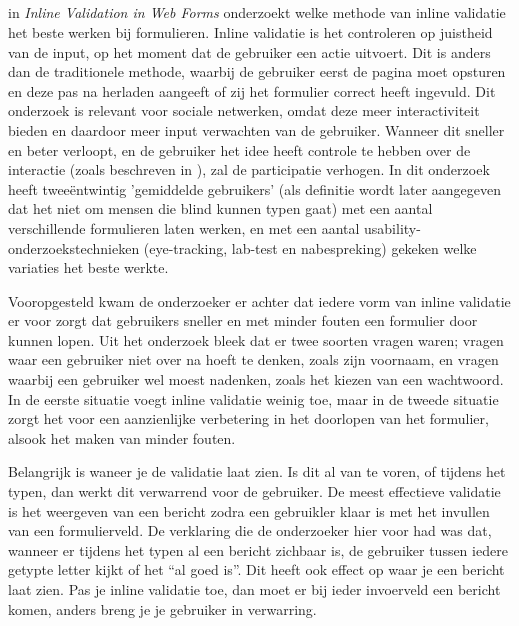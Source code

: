 \documentclass[a4paper, 10pt, pdftex]{report}
\begin{document}
  \subsection{\cite{Wroblewski2009}}
    in \emph{Inline Validation in Web Forms} onderzoekt \citeauthor{Wroblewski2009} welke methode van inline validatie het beste werken bij formulieren. Inline validatie is het controleren op juistheid van de input, op het moment dat de gebruiker een actie uitvoert. Dit is anders dan de traditionele methode, waarbij de gebruiker eerst de pagina moet opsturen en deze pas na herladen aangeeft of zij het formulier correct heeft ingevuld. Dit onderzoek is relevant voor sociale netwerken, omdat deze meer interactiviteit bieden en daardoor meer input verwachten van de gebruiker. Wanneer dit sneller en beter verloopt, en de gebruiker het idee heeft controle te hebben over de interactie (zoals beschreven in \cite{Beenen2004}), zal de participatie verhogen. In dit onderzoek heeft \citeauthor{Wroblewski2009} twee\"{e}ntwintig 'gemiddelde gebruikers'  (als definitie wordt later aangegeven dat het niet om mensen die blind kunnen typen gaat) met een aantal verschillende formulieren laten werken, en met een aantal usability-onderzoekstechnieken (eye-tracking, lab-test en nabespreking) gekeken welke variaties het beste werkte.

    Vooropgesteld kwam de onderzoeker er achter  dat iedere vorm van inline validatie er voor zorgt dat gebruikers sneller en met minder fouten een formulier door kunnen lopen. Uit het onderzoek bleek dat er twee soorten vragen waren; vragen waar een gebruiker niet over na hoeft te denken, zoals zijn voornaam, en vragen waarbij een gebruiker wel moest nadenken, zoals het kiezen van een wachtwoord. In de eerste situatie voegt inline validatie weinig toe, maar in de tweede situatie zorgt het voor een aanzienlijke verbetering in het doorlopen van het formulier, alsook het maken van minder fouten.

    Belangrijk is waneer je de validatie laat zien. Is dit al van te voren, of tijdens het typen, dan werkt dit verwarrend voor de gebruiker. De meest effectieve validatie is het weergeven van een bericht zodra een gebruikler klaar is met het invullen van een formulierveld. De verklaring die de onderzoeker hier voor had was dat, wanneer er tijdens het typen al een bericht zichbaar is, de gebruiker tussen iedere getypte letter kijkt of het ``al goed is''. Dit heeft ook effect op waar je een bericht laat zien. Pas je inline validatie toe, dan moet er bij ieder invoerveld een bericht komen, anders breng je je gebruiker in verwarring.
\end{document}
